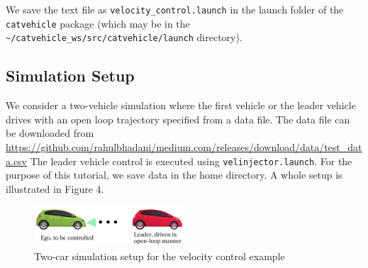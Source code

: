 \documentclass[
]{article}
\newenvironment{Shaded}{\begin{snugshade}}{\end{snugshade}}
\newcommand{\FunctionTok}[1]{\textcolor[rgb]{0.00,0.00,0.00}{#1}}
\newcommand{\KeywordTok}[1]{\textcolor[rgb]{0.13,0.29,0.53}{\textbf{#1}}}
\newcommand{\NormalTok}[1]{#1}
\newcommand{\OtherTok}[1]{\textcolor[rgb]{0.56,0.35,0.01}{#1}}
\newcommand{\StringTok}[1]{\textcolor[rgb]{0.31,0.60,0.02}{#1}}
\begin{document}
\begin{Shaded}
\end{Shaded}

We save the text file as \texttt{velocity\_control.launch} in the launch
folder of the \texttt{catvehicle} package (which may be in the
\texttt{\textasciitilde{}/catvehicle\_ws/src/catvehicle/launch}
directory).

\hypertarget{simulation-setup}{%
\subsection{Simulation Setup}\label{simulation-setup}}

We consider a two-vehicle simulation where the first vehicle or the
leader vehicle drives with an open loop trajectory specified from a data
file. The data file can be downloaded from
\url{https://github.com/rahulbhadani/medium.com/releases/download/data/test_data.csv}
The leader vehicle control is executed using
\texttt{velinjector.launch}. For the purpose of this tutorial, we save
data in the home directory. A whole setup is illustrated in Figure 4.

\begin{figure}[htbp]
\centering
\includegraphics[width=0.5\textwidth]{ego_leader.png}
\caption{Two-car simulation setup for the velocity control example}
\label{fig:ego_leader.png}
\end{figure}
\end{document}
